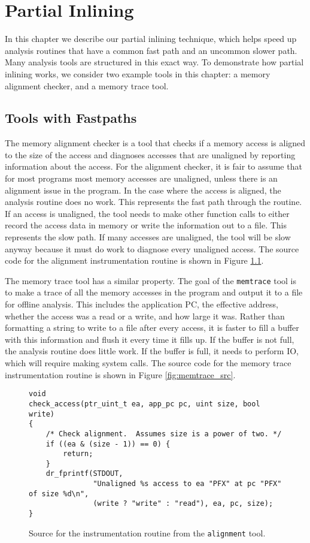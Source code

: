 \chapter{Partial Inlining}
\label{sec:partial_inlining}

In this chapter we describe our partial inlining technique, which helps speed up
analysis routines that have a common fast path and an uncommon slower path.
Many analysis tools are structured in this exact way.  To demonstrate how
partial inlining works, we consider two example tools in this chapter: a memory
alignment checker, and a memory trace tool.

\section{Tools with Fastpaths}

The memory alignment checker is a tool that checks if a memory access is aligned
to the size of the access and diagnoses accesses that are unaligned by reporting
information about the access.  For the alignment checker, it is fair to assume
that for most programs most memory accesses are unaligned, unless there is an
alignment issue in the program.  In the case where the access is aligned, the
analysis routine does no work.  This represents the fast path through the
routine.  If an access is unaligned, the tool needs to make other function calls
to either record the access data in memory or write the information out to a
file.  This represents the slow path.  If many accesses are unaligned, the tool
will be slow anyway because it must do work to diagnose every unaligned access.
The source code for the alignment instrumentation routine is shown in Figure
\ref{fig:alignment_src}.

The memory trace tool has a similar property.  The goal of the {\tt memtrace}
tool is to make a trace of all the memory accesses in the program and output it
to a file for offline analysis.  This includes the application PC, the effective
address, whether the access was a read or a write, and how large it was.  Rather
than formatting a string to write to a file after every access, it is faster to
fill a buffer with this information and flush it every time it fills up.  If the
buffer is not full, the analysis routine does little work.  If the buffer is
full, it needs to perform IO, which will require making system calls.  The
source code for the memory trace instrumentation routine is shown in Figure
\ref{fig:memtrace_src}.

\begin{figure}
\begin{verbatim}
void
check_access(ptr_uint_t ea, app_pc pc, uint size, bool write)
{
    /* Check alignment.  Assumes size is a power of two. */
    if ((ea & (size - 1)) == 0) {
        return;
    }
    dr_fprintf(STDOUT,
               "Unaligned %s access to ea "PFX" at pc "PFX" of size %d\n",
               (write ? "write" : "read"), ea, pc, size);
}
\end{verbatim}
\caption{Source for the instrumentation routine from the {\tt alignment} tool.}
\label{fig:alignment_src}
\end{figure}

